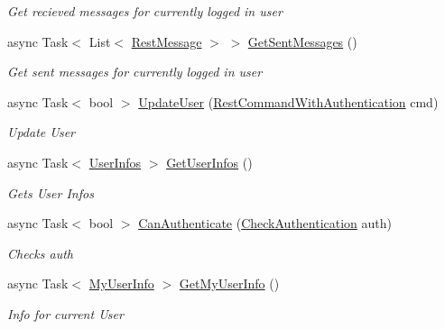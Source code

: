 \begin{DoxyCompactItemize}
\begin{DoxyCompactList}\small\item\em Get recieved messages for currently logged in user \end{DoxyCompactList}\item 
async Task$<$ List$<$ \mbox{\hyperlink{class_tutor_scout24_1_1_models_1_1_chat_1_1_rest_message}{Rest\+Message}} $>$ $>$ \mbox{\hyperlink{class_tutor_scout24_1_1_services_1_1_tutor_scout_rest_service_a1efcdc1fe62961a72d354f4fe5170d18}{Get\+Sent\+Messages}} ()
\begin{DoxyCompactList}\small\item\em Get sent messages for currently logged in user \end{DoxyCompactList}\item 
async Task$<$ bool $>$ \mbox{\hyperlink{class_tutor_scout24_1_1_services_1_1_tutor_scout_rest_service_a6f94210e708fe30a18c712db702d13d9}{Update\+User}} (\mbox{\hyperlink{class_tutor_scout24_1_1_models_1_1_rest_command_with_authentication}{Rest\+Command\+With\+Authentication}} cmd)
\begin{DoxyCompactList}\small\item\em Update User \end{DoxyCompactList}\item 
async Task$<$ \mbox{\hyperlink{class_tutor_scout24_1_1_models_1_1_user_data_1_1_user_infos}{User\+Infos}} $>$ \mbox{\hyperlink{class_tutor_scout24_1_1_services_1_1_tutor_scout_rest_service_a42b608e3ef3bb174d1a101e4b36046c3}{Get\+User\+Infos}} ()
\begin{DoxyCompactList}\small\item\em Gets User Infos \end{DoxyCompactList}\item 
async Task$<$ bool $>$ \mbox{\hyperlink{class_tutor_scout24_1_1_services_1_1_tutor_scout_rest_service_ad896af0129cadfceb66a35932bed7086}{Can\+Authenticate}} (\mbox{\hyperlink{class_tutor_scout24_1_1_models_1_1_user_data_1_1_check_authentication}{Check\+Authentication}} auth)
\begin{DoxyCompactList}\small\item\em Checks auth \end{DoxyCompactList}\item 
async Task$<$ \mbox{\hyperlink{class_tutor_scout24_1_1_models_1_1_user_data_1_1_my_user_info}{My\+User\+Info}} $>$ \mbox{\hyperlink{class_tutor_scout24_1_1_services_1_1_tutor_scout_rest_service_a4a4407306592193566c761cb66332bb5}{Get\+My\+User\+Info}} ()
\begin{DoxyCompactList}\small\item\em Info for current User \end{DoxyCompactList}\item 

\end{DoxyCompactItemize}
